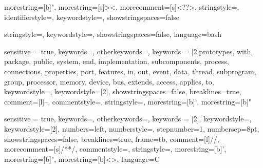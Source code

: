 


{
    morestring=[b]",
    morestring=[s]{>}{<},
    morecomment=[s]{<?}{?>},
    stringstyle=\color{black},
    identifierstyle=\color{darkblue},
    keywordstyle=\color{cyan},
    showstringspaces=false
}


{
    stringstyle=\color{blue},
    keywordstyle=\color{blue},
    showstringspaces=false,
    language=bash
}



{
	sensitive = true,
	keywords={},
	otherkeywords={},%
  	keywords = [2]{prototypes, with, package, public, system, end, implementation, subcomponents, process, connections, properties, port, features, in, out, event, data, thread, subprogram, group, processor, memory, device, bus, extends, access, applies, to},
  	keywordstyle=\color{blue},
  	keywordstyle=[2]\color{aadl_keywords_purple},%
  	showstringspaces=false,
  	breaklines=true,
  	comment=[l]{--},
  	commentstyle=\color{aadl_comment_green}\ttfamily,
  	stringstyle=\color{red}\ttfamily,
  	morestring=[b]',
  	morestring=[b]"
}

\newcommand{\aadl}[1]{\lstinline[language=AADL]{#1}}



{
	sensitive = true,
	keywords={},
	otherkeywords={},%
  	keywords = [2]{},
  	keywordstyle=\color{ros_keyword},
  	keywordstyle=[2]\color{ros_keyword},%
  	numbers=left,
  	numberstyle=\scriptsize,
  	stepnumber=1,
  	numbersep=8pt,
  	showstringspaces=false,
  	breaklines=true,
  	frame=tb,
  	comment=[l]{//},
  	morecomment=[s]{/*}{*/},
  	commentstyle=\color{aadl_comment_green}\ttfamily,
  	stringstyle=\color{ros_string}\ttfamily,
  	morestring=[b]',
  	morestring=[b]",
    morestring=[b]{<}{>},
    language=C
}

